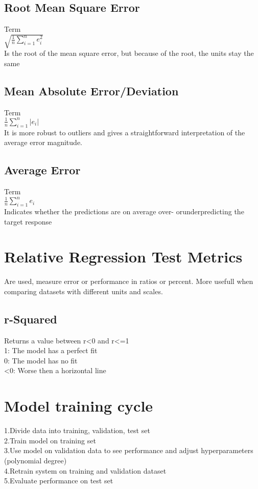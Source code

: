 \documentclass{article}
\begin{document}
\subsection{Root Mean Square Error}
Term\\
$ \sqrt{\frac{1}{n} \sum_{i = 1}^{n} e_i^2 }$  \\
Is the root of the mean square error, but because of the root, the units stay the same
\subsection{Mean Absolute Error/Deviation}
Term\\
$ \frac{1}{n} \sum_{i = 1}^{n} | e_i\vert$ \\
It is more robust to outliers and gives a straightforward interpretation of the average error magnitude.
\subsection{Average Error}
Term\\
$ \frac{1}{n} \sum_{i = 1}^{n} e_i$ \\
Indicates whether the predictions are on average over- orunderpredicting the target response
\section{Relative Regression Test Metrics}
Are used, measure error or performance in ratios or percent. More usefull when comparing datasets with different units and scales. \\ 

\subsection{r-Squared}
Returns a value between r<0 and r<=1\\
1: The model has a perfect fit \\
0: The model has no fit \\
<0: Worse then a horizontal line\\
\section{Model training cycle}
1.Divide data into training, validation, test set \\ 
2.Train model on training set\\
3.Use model on validation data to see performance and adjust hyperparameters (polynomial degree)\\
4.Retrain system on training and validation dataset \\ 
5.Evaluate performance on test set \\
\end{document}
